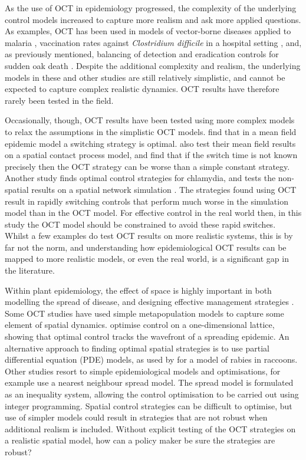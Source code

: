 As the use of OCT in epidemiology progressed, the complexity of the underlying control models increased to capture more realism and ask more applied questions. As examples, OCT has been used in models of vector-borne diseases applied to malaria \citep{blayneh_optimal_2009}, vaccination rates against \emph{Clostridium difficile} in a hospital setting \citep{stephenson_optimal_2017}, and, as previously mentioned, balancing of detection and eradication controls for sudden oak death \citep{ndeffo_mbah_balancing_2010}. Despite the additional complexity and realism, the underlying models in these and other studies are still relatively simplistic, and cannot be expected to capture complex realistic dynamics. OCT results have therefore rarely been tested in the field.

Occasionally, though, OCT results have been tested using more complex models to relax the assumptions in the simplistic OCT models. \citet{forster_optimizing_2007} find that in a mean field epidemic model a switching strategy is optimal. \citeauthor{forster_optimizing_2007} also test their mean field results on a spatial contact process model, and find that if the switch time is not known precisely then the OCT strategy can be worse than a simple constant strategy. Another study finds optimal control strategies for chlamydia, and tests the non-spatial results on a spatial network simulation \citep{clarke_approximating_2013}. The strategies found using OCT result in rapidly switching controls that perform much worse in the simulation model than in the OCT model. For effective control in the real world then, in this study the OCT model should be constrained to avoid these rapid switches. Whilst a few examples do test OCT results on more realistic systems, this is by far not the norm, and understanding how epidemiological OCT results can be mapped to more realistic models, or even the real world, is a significant gap in the literature.

Within plant epidemiology, the effect of space is highly important in both modelling the spread of disease, and designing effective management strategies \citep{ostfeld_spatial_2005, plantegenest_landscape_2007}. Some OCT studies have used simple metapopulation models to capture some element of spatial dynamics. \citet{ndeffo_mbah_optimal_2014} optimise control on a one-dimensional lattice, showing that optimal control tracks the wavefront of a spreading epidemic. An alternative approach to finding optimal spatial strategies is to use partial differential equation (PDE) models, as used by \citet{neilan_optimal_2011} for a model of rabies in raccoons. Other studies resort to simple epidemiological models and optimisations, for example \citet{epanchin_optimal_2012} use a nearest neighbour spread model. The spread model is formulated as an inequality system, allowing the control optimisation to be carried out using integer programming. Spatial control strategies can be difficult to optimise, but use of simpler models could result in strategies that are not robust when additional realism is included. Without explicit testing of the OCT strategies on a realistic spatial model, how can a policy maker be sure the strategies are robust?

